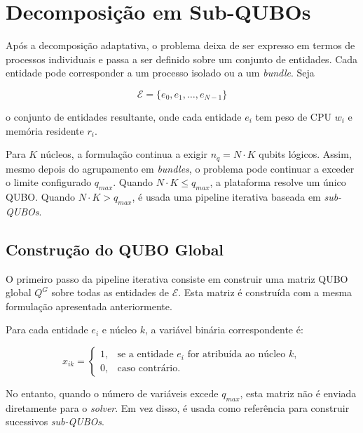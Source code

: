 \chapter{Decomposição em Sub-QUBOs}
\label{chap:decomposicao-subqubo}

Após a decomposição adaptativa, o problema deixa de ser expresso em termos de
processos individuais e passa a ser definido sobre um conjunto de entidades. Cada entidade pode corresponder a um processo isolado ou a um
\textit{bundle}. Seja

\begin{equation}
    \mathcal{E} = \{e_0, e_1, \dots, e_{N-1}\}
\end{equation}

o conjunto de entidades resultante, onde cada entidade $e_i$ tem peso de
\acs{CPU} $w_i$ e memória residente $r_i$. 

Para $K$ núcleos, a formulação
continua a exigir $n_q = N \cdot K$ qubits lógicos. Assim, mesmo depois do agrupamento em \textit{bundles}, o problema
pode continuar a exceder o limite configurado $q_{max}$. Quando
$N \cdot K \leq q_{max}$, a plataforma resolve um único \acs{QUBO}. Quando
$N \cdot K > q_{max}$, é usada uma pipeline iterativa baseada em
\textit{sub-QUBOs}.

\section{Construção do QUBO Global}
\label{sec:construcao-qubo-global-subqubo}

O primeiro passo da pipeline iterativa consiste em construir uma matriz
\acs{QUBO} global $Q^{G}$ sobre todas as entidades de $\mathcal{E}$. Esta matriz
é construída com a mesma formulação apresentada anteriormente.

Para cada entidade $e_i$ e núcleo $k$, a variável binária correspondente é:

\begin{equation}
    x_{ik} =
    \begin{cases}
        1, & \text{se a entidade } e_i \text{ for atribuída ao núcleo } k,\\
        0, & \text{caso contrário.}
    \end{cases}
\end{equation}

No entanto, quando o número de variáveis excede
$q_{max}$, esta matriz não é enviada diretamente para o \textit{solver}. Em vez
disso, é usada como referência para construir sucessivos \textit{sub-QUBOs}.

